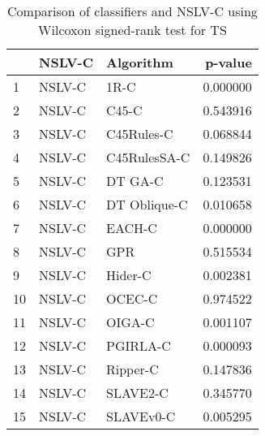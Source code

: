 \begin{table}
\footnotesize
\caption{Comparison of classifiers and NSLV-C using Wilcoxon signed-rank test for TS}
\label{tab:NSLV-C wilcoxon TS comparison}
\begin{tabular}{lllr}
\hline
 & NSLV-C & Algorithm & p-value \\
\hline
1 & NSLV-C & 1R-C & 0.000000 \\
2 & NSLV-C & C45-C & 0.543916 \\
3 & NSLV-C & C45Rules-C & 0.068844 \\
4 & NSLV-C & C45RulesSA-C & 0.149826 \\
5 & NSLV-C & DT GA-C & 0.123531 \\
6 & NSLV-C & DT Oblique-C & 0.010658 \\
7 & NSLV-C & EACH-C & 0.000000 \\
8 & NSLV-C & GPR & 0.515534 \\
9 & NSLV-C & Hider-C & 0.002381 \\
10 & NSLV-C & OCEC-C & 0.974522 \\
11 & NSLV-C & OIGA-C & 0.001107 \\
12 & NSLV-C & PGIRLA-C & 0.000093 \\
13 & NSLV-C & Ripper-C & 0.147836 \\
14 & NSLV-C & SLAVE2-C & 0.345770 \\
15 & NSLV-C & SLAVEv0-C & 0.005295 \\
\hline
\end{tabular}
\end{table}
